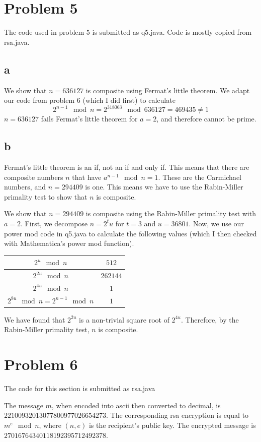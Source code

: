 \documentclass{article}
\begin{document}
\section*{Problem 5}
The code used in problem 5 is submitted as q5.java. Code is mostly copied from rsa.java. 
\subsection*{a}
We show that $n=636127$ is composite using Fermat's little theorem. We adapt our code from problem 6 (which I did first) to calculate
$$2^{n-1} \mod n = 2^{318063} \mod 636127 = 469435 \neq 1$$
$n=636127$ fails Fermat's little theorem for $a=2$, and therefore cannot be prime.  
\subsection*{b}
Fermat's little theorem is an if, not an if and only if. This means that there are composite numbers $n$ that have $a^{n-1} \mod n  = 1$. These are the Carmichael numbers, and $n=294409$ is one. This means we have to use the Rabin-Miller primality test to show that $n$ is composite. 

We show that $n=294409$ is composite using the Rabin-Miller primality test with $a=2$. First, we decompose $n = 2^t u$ for $t=3$ and $u=36801$. Now, we use our power mod code in q5.java to calculate the following values (which I then checked with Mathematica's power mod function). 

\begin{center}
\begin{tabular}{ | c | c |}
\hline
$ 2^u \mod n$ & $512$ \\
\hline
$ 2^{2u} \mod n$ & $262144$ \\
\hline
$ 2^{4u} \mod n$ & $1$ \\
\hline
$ 2 ^ {8u} \mod n = 2^{n-1} \mod n$ & $1$ \\
\hline
\end{tabular}
\end{center}
We have found that $2^{2u}$ is a non-trivial square root of $2^{4u}$. Therefore, by the Rabin-Miller primality test, $n$ is composite. 

\section*{Problem 6}
The code for this section is submitted as rsa.java

The message $m$, when encoded into ascii then converted to decimal, is $22100932013077800977026654273$. The corresponding rsa encryption is equal to $m^e \mod n$, where $(n, e)$ is the recipient's public key. The encrypted message is $27016764340118192395712492378$.
\end{document}
